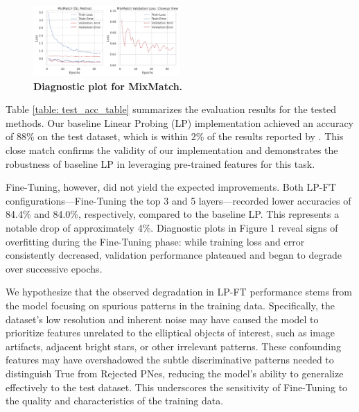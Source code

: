 \documentclass{article}
\begin{document}
\begin{figure}[h!]
    \centering
    \includegraphics[width=0.5\textwidth]{mixmatch_plots.jpeg}
    \caption{\textbf{Diagnostic plot for MixMatch.}}
    \label{fig:diagnostic_plot}
\end{figure}


Table \ref{table: test_acc_table} summarizes the evaluation results for the tested methods. Our baseline Linear Probing (LP) implementation achieved an accuracy of 88\% on the test dataset, which is within 2\% of the results reported by \cite{awangiskandar2020}. This close match confirms the validity of our implementation and demonstrates the robustness of baseline LP in leveraging pre-trained features for this task.

Fine-Tuning, however, did not yield the expected improvements. Both LP-FT configurations—Fine-Tuning the top 3 and 5 layers—recorded lower accuracies of 84.4\% and 84.0\%, respectively, compared to the baseline LP. This represents a notable drop of approximately 4\%. Diagnostic plots in Figure 1 reveal signs of overfitting during the Fine-Tuning phase: while training loss and error consistently decreased, validation performance plateaued and began to degrade over successive epochs.

We hypothesize that the observed degradation in LP-FT performance stems from the model focusing on spurious patterns in the training data. Specifically, the dataset's low resolution and inherent noise may have caused the model to prioritize features unrelated to the elliptical objects of interest, such as image artifacts, adjacent bright stars, or other irrelevant patterns. These confounding features may have overshadowed the subtle discriminative patterns needed to distinguish True from Rejected PNes, reducing the model’s ability to generalize effectively to the test dataset. This underscores the sensitivity of Fine-Tuning to the quality and characteristics of the training data.
\end{document}
